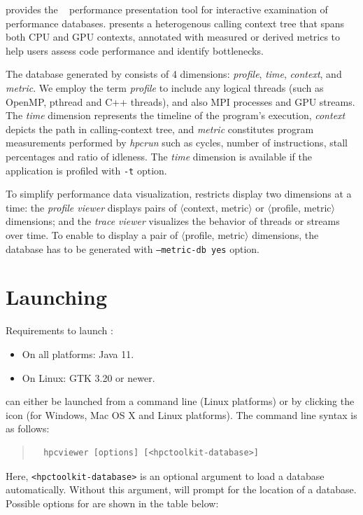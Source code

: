 

\HPCToolkit{} provides the \hpcviewer{}~\cite{Adhianto-MC-Ta:2010:PSTI-hpcviewer,Tallent-MC-etal:2011:ICS-hpctoolkit-scalable-tracing} performance presentation tool for interactive examination of performance databases.
\hpcviewer{}  presents a heterogenous
calling context tree that spans both CPU and GPU contexts, annotated
with measured or derived metrics to help users assess code performance
and identify bottlenecks.

The database generated by \hpcprof{} consists of 4 dimensions: \emph{profile}, \emph{time}, \emph{context}, and \emph{metric}.  
We employ the term \emph{profile} to include any logical threads (such as OpenMP, pthread and C++ threads), and also MPI processes and GPU streams.
The \emph{time} dimension represents the timeline of the program's execution, \emph{context} depicts the path in calling-context tree, and \emph{metric} constitutes program measurements performed by \textit{hpcrun} such as cycles, number of instructions, stall percentages and ratio of idleness.
The \emph{time} dimension is available if the application is profiled with \hpcrun{} \texttt{-t} option.  


To simplify performance data visualization, \hpcviewer{} restricts
display two dimensions at a time: the \emph{profile viewer} displays
pairs of $\langle$context, metric$\rangle$ or $\langle$profile,
metric$\rangle$ dimensions; and the \emph{trace viewer} visualizes the
behavior of threads or streams over time.
To enable to display a pair of $\langle$profile, metric$\rangle$ dimensions, the database has to be generated with \hpcprof{} \texttt{--metric-db yes} option.



\section{Launching}

Requirements to launch \hpcviewer:
\begin{itemize}
 \item On all platforms: Java 11.
 \item On Linux: GTK 3.20 or newer.
\end{itemize}

\hpcviewer{} can either be launched from a command line (Linux platforms) or by clicking the \hpcviewer{} icon (for Windows, Mac OS X and Linux platforms).
The command line syntax is as follows:
\begin{quote}
\begin{verbatim}
  hpcviewer [options] [<hpctoolkit-database>]
\end{verbatim}
\end{quote}
Here, \texttt{<hpctoolkit-database>} is an optional argument to load a database automatically.
Without this argument, \hpcviewer{} will prompt for the location of a database. Possible options for \hpcviewer{}  are shown in the table below:\\

